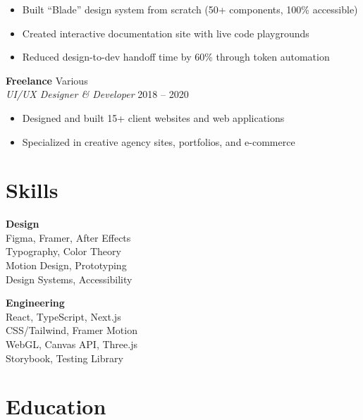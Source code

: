 \documentclass[10pt,letterpaper]{article}
\begin{document}
\begin{itemize}
\item Built ``Blade'' design system from scratch (50+ components, 100\% accessible)
\item Created interactive documentation site with live code playgrounds
\item Reduced design-to-dev handoff time by 60\% through token automation
\end{itemize}

\vspace{12pt}
\textbf{Freelance} \hfill Various\\
{\color{designpink}\textit{UI/UX Designer \& Developer}} \hfill 2018 -- 2020

\begin{itemize}
\item Designed and built 15+ client websites and web applications
\item Specialized in creative agency sites, portfolios, and e-commerce
\end{itemize}

\section{Skills}

\begin{minipage}[t]{0.45\linewidth}
\textbf{\color{designpink}Design}\\[4pt]
Figma, Framer, After Effects\\
Typography, Color Theory\\
Motion Design, Prototyping\\
Design Systems, Accessibility
\end{minipage}\hfill
\begin{minipage}[t]{0.45\linewidth}
\textbf{\color{designpink}Engineering}\\[4pt]
React, TypeScript, Next.js\\
CSS/Tailwind, Framer Motion\\
WebGL, Canvas API, Three.js\\
Storybook, Testing Library
\end{minipage}

\vspace{16pt}

\section{Education}
\end{document}

